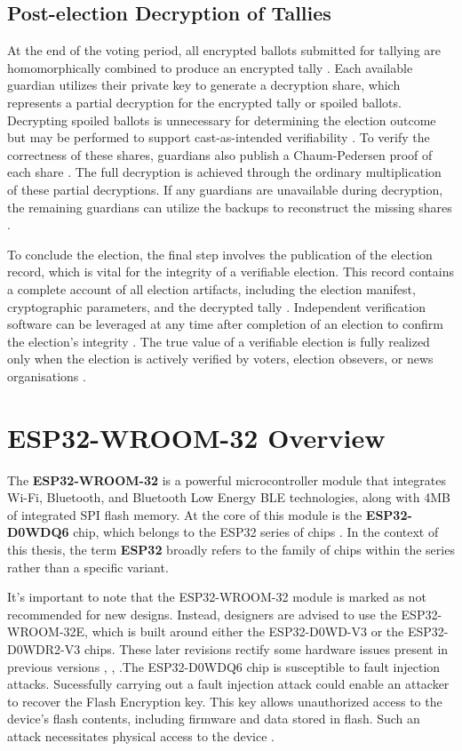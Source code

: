 \subsection{Post-election Decryption of Tallies}
At the end of the voting period, all encrypted ballots submitted for tallying are homomorphically combined to produce an encrypted tally \cite[5,18]{eg-spec} \cite[15]{eg-paper}. Each available guardian utilizes their private key to generate a decryption share, which represents a partial decryption for the encrypted tally or spoiled ballots. Decrypting spoiled ballots is unnecessary for determining the election outcome but may be performed to support cast-as-intended verifiability \cite[15,17]{eg-paper} \cite[18]{eg-spec}. To verify the correctness of these shares, guardians also publish a Chaum-Pedersen proof of each share \cite[18]{eg-spec}. The full decryption is achieved through the ordinary multiplication of these partial decryptions. If any guardians are unavailable during decryption, the remaining guardians can utilize the backups to reconstruct the missing shares \cite{eg-docs}.

To conclude the election, the final step involves the publication of the election record, which is vital for the integrity of a verifiable election. This record contains a complete account of all election artifacts, including the election manifest, cryptographic parameters, and the decrypted tally \cite[24]{eg-spec}. Independent verification software can be leveraged at any time after completion of an election to confirm the election's integrity \cite[6]{eg-paper}. The true value of a verifiable election is fully realized only when the election is actively verified by voters, election obsevers, or news organisations \cite[17]{eg-spec}. 


\section{ESP32-WROOM-32 Overview}
The \textbf{ESP32-WROOM-32} is a powerful microcontroller module that integrates Wi-Fi, Bluetooth, and Bluetooth Low Energy \ac{BLE} technologies, along with 4MB of integrated SPI flash memory. At the core of this module is the \textbf{ESP32-D0WDQ6} chip, which belongs to the ESP32 series of chips  \cite[6]{esp32-module}. In the context of this thesis, the term \textbf{ESP32} broadly refers to the family of chips within the series rather than a specific variant. 

It's important to note that the ESP32-WROOM-32 module is marked as not recommended for new designs. Instead, designers are advised to use the ESP32-WROOM-32E, which is built around either the ESP32-D0WD-V3 or the ESP32-D0WDR2-V3 chips. These later revisions rectify some hardware issues present in previous versions \cite[1]{esp32-module-new}, \cite[11]{esp32-series}, \cite[3-4]{esp32-errata}.The ESP32-D0WDQ6 chip is susceptible to fault injection attacks. Sucessfully carrying out a fault injection attack could enable an attacker to recover the Flash Encryption key. This key allows unauthorized access to the device's flash contents, including firmware and data stored in flash. Such an attack necessitates physical access to the device \cite{chip-revision}. 

